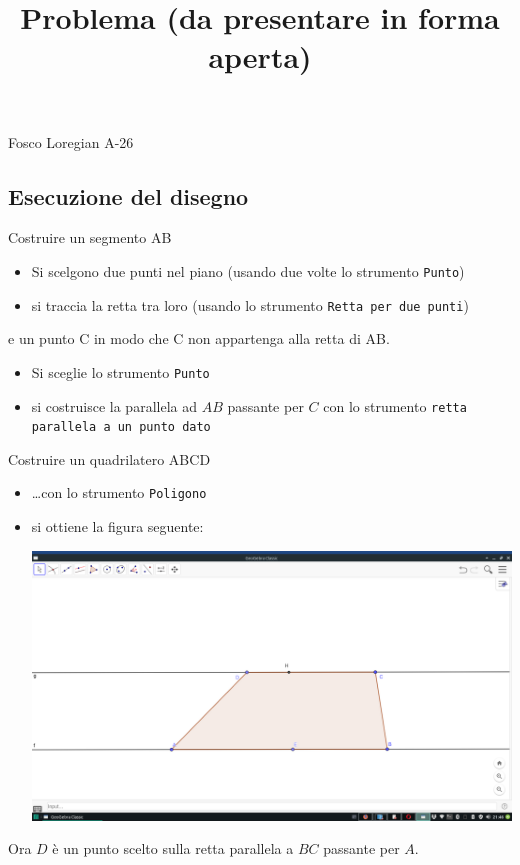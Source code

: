 \documentclass{article}
\author{}
\date{}
\title{Problema (da presentare in forma aperta)}
\begin{document}
\maketitle
\noindent
Fosco Loregian \hfill A-26
\subsection{Esecuzione del disegno}
Costruire un segmento AB 
\begin{itemize}
  \item Si scelgono due punti nel piano (usando due volte lo strumento {\tt Punto})
  \item si traccia la retta tra loro (usando lo strumento {\tt Retta per due punti})
\end{itemize}
e un punto C in modo che C non appartenga alla retta di AB.
\begin{itemize}
  \item Si sceglie lo strumento {\tt Punto}
  \item si costruisce la parallela ad $AB$ passante per $C$ con lo strumento {\tt retta parallela a un punto dato}
\end{itemize}
Costruire un quadrilatero ABCD 
\begin{itemize}
  \item \dots con lo strumento {\tt Poligono}
  \item si ottiene la figura seguente:
  \begin{center}
    \includegraphics[width=.75\textwidth]{quadril.png}
  \end{center}
\end{itemize}
Ora $D$ è un punto scelto sulla retta parallela a $BC$ passante per $A$.
\end{document}
